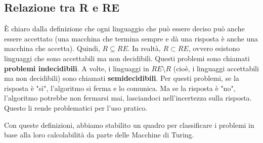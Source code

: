 \documentclass[a4paper]{article}
\theoremstyle{definition} %
\begin{document}
\subsection{Relazione tra R e RE}
È chiaro dalla definizione che ogni linguaggio che può essere deciso può anche essere accettato (una macchina che termina sempre e dà una risposta è anche una macchina che accetta). Quindi, $R \subseteq RE$.
In realtà, $R \subset RE$, ovvero esistono linguaggi che sono accettabili ma non decidibili. Questi problemi sono chiamati \textbf{problemi indecidibili}.
A volte, i linguaggi in $RE \setminus R$ (cioè, i linguaggi accettabili ma non decidibili) sono chiamati \textbf{semidecidibili}. Per questi problemi, se la risposta è "sì", l'algoritmo si ferma e lo comunica. Ma se la risposta è "no", l'algoritmo potrebbe non fermarsi mai, lasciandoci nell'incertezza sulla risposta. Questo li rende problematici per l'uso pratico.

Con queste definizioni, abbiamo stabilito un quadro per classificare i problemi in base alla loro calcolabilità da parte delle Macchine di Turing.
\end{document}
